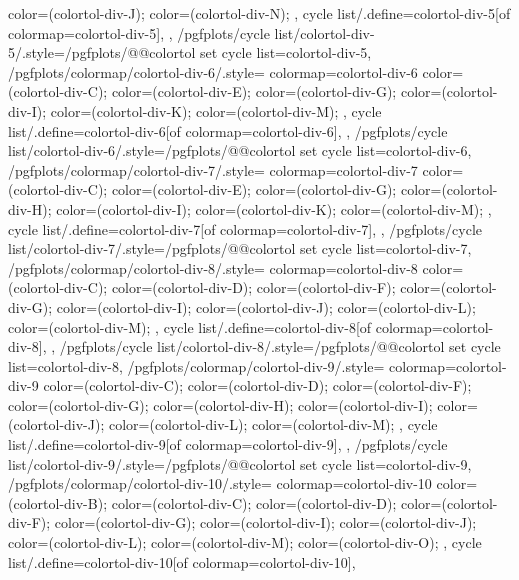 {{{      color=(colortol-div-J);
      color=(colortol-div-N);
    },
    cycle list/.define={colortol-div-5}{[of colormap=colortol-div-5]},
  },
  /pgfplots/cycle list/colortol-div-5/.style={/pgfplots/@@colortol set cycle list={colortol-div-5}},
  /pgfplots/colormap/colortol-div-6/.style={
    colormap={colortol-div-6}{
      color=(colortol-div-C);
      color=(colortol-div-E);
      color=(colortol-div-G);
      color=(colortol-div-I);
      color=(colortol-div-K);
      color=(colortol-div-M);
    },
    cycle list/.define={colortol-div-6}{[of colormap=colortol-div-6]},
  },
  /pgfplots/cycle list/colortol-div-6/.style={/pgfplots/@@colortol set cycle list={colortol-div-6}},
  /pgfplots/colormap/colortol-div-7/.style={
    colormap={colortol-div-7}{
      color=(colortol-div-C);
      color=(colortol-div-E);
      color=(colortol-div-G);
      color=(colortol-div-H);
      color=(colortol-div-I);
      color=(colortol-div-K);
      color=(colortol-div-M);
    },
    cycle list/.define={colortol-div-7}{[of colormap=colortol-div-7]},
  },
  /pgfplots/cycle list/colortol-div-7/.style={/pgfplots/@@colortol set cycle list={colortol-div-7}},
  /pgfplots/colormap/colortol-div-8/.style={
    colormap={colortol-div-8}{
      color=(colortol-div-C);
      color=(colortol-div-D);
      color=(colortol-div-F);
      color=(colortol-div-G);
      color=(colortol-div-I);
      color=(colortol-div-J);
      color=(colortol-div-L);
      color=(colortol-div-M);
    },
    cycle list/.define={colortol-div-8}{[of colormap=colortol-div-8]},
  },
  /pgfplots/cycle list/colortol-div-8/.style={/pgfplots/@@colortol set cycle list={colortol-div-8}},
  /pgfplots/colormap/colortol-div-9/.style={
    colormap={colortol-div-9}{
      color=(colortol-div-C);
      color=(colortol-div-D);
      color=(colortol-div-F);
      color=(colortol-div-G);
      color=(colortol-div-H);
      color=(colortol-div-I);
      color=(colortol-div-J);
      color=(colortol-div-L);
      color=(colortol-div-M);
    },
    cycle list/.define={colortol-div-9}{[of colormap=colortol-div-9]},
  },
  /pgfplots/cycle list/colortol-div-9/.style={/pgfplots/@@colortol set cycle list={colortol-div-9}},
  /pgfplots/colormap/colortol-div-10/.style={
    colormap={colortol-div-10}{
      color=(colortol-div-B);
      color=(colortol-div-C);
      color=(colortol-div-D);
      color=(colortol-div-F);
      color=(colortol-div-G);
      color=(colortol-div-I);
      color=(colortol-div-J);
      color=(colortol-div-L);
      color=(colortol-div-M);
      color=(colortol-div-O);
    },
    cycle list/.define={colortol-div-10}{[of colormap=colortol-div-10]},
}}
